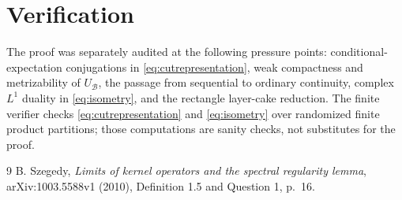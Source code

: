 \documentclass[11pt]{article}
\newcommand{\cB}{\mathcal B}
\begin{document}
\section{Verification}

The proof was separately audited at the following pressure points:
conditional-expectation conjugations in \eqref{eq:cutrepresentation}, weak
compactness and metrizability of $U_{\cB}$, the passage from sequential to
ordinary continuity, complex $L^1$ duality in \eqref{eq:isometry}, and the
rectangle layer-cake reduction.  The finite verifier checks
\eqref{eq:cutrepresentation} and \eqref{eq:isometry} over randomized finite
product partitions; those computations are sanity checks, not substitutes
for the proof.

\begin{thebibliography}{9}
B. Szegedy,
\emph{Limits of kernel operators and the spectral regularity lemma},
arXiv:1003.5588v1 (2010), Definition 1.5 and Question 1, p.~16.
\end{thebibliography}
\end{document}
